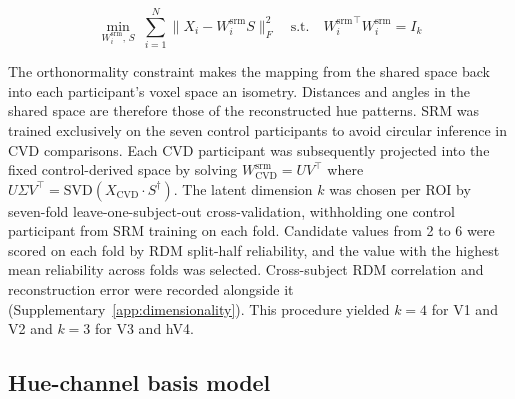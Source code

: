 \begin{equation}
  \min_{W^{\mathrm{srm}}_i,\,S}\;\sum_{i=1}^N \|X_i - W^{\mathrm{srm}}_i S\|_F^2 \quad\text{s.t.}\quad {W^{\mathrm{srm}}_i}^\top W^{\mathrm{srm}}_i = I_k
\end{equation}

The orthonormality constraint makes the mapping from the shared space back into each participant's voxel space an isometry. Distances and angles in the shared space are therefore those of the reconstructed hue patterns. SRM was trained exclusively on the seven control participants to avoid circular inference in CVD comparisons. Each CVD participant was subsequently projected into the fixed control-derived space by solving $W^{\mathrm{srm}}_\text{CVD} = UV^\top$ where $U\Sigma V^\top = \text{SVD}(X_\text{CVD}\cdot S^\dagger)$. The latent dimension $k$ was chosen per ROI by seven-fold leave-one-subject-out cross-validation, withholding one control participant from SRM training on each fold. Candidate values from 2 to 6 were scored on each fold by RDM split-half reliability, and the value with the highest mean reliability across folds was selected. Cross-subject RDM correlation and reconstruction error were recorded alongside it (Supplementary~\cref{app:dimensionality}). This procedure yielded $k = 4$ for V1 and V2 and $k = 3$ for V3 and hV4.

\subsection{Hue-channel basis model}
\label{sec:methods:encoding}

